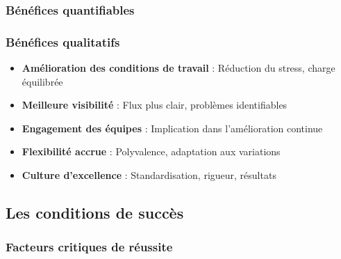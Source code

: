 \documentclass[12pt,a4paper]{article}
\begin{document}
\begin{center}
\subsubsection{Bénéfices quantifiables}

\begin{center}
\end{center}

\subsubsection{Bénéfices qualitatifs}

\begin{itemize}
    \item \textbf{Amélioration des conditions de travail} : Réduction du stress, charge équilibrée
    \item \textbf{Meilleure visibilité} : Flux plus clair, problèmes identifiables
    \item \textbf{Engagement des équipes} : Implication dans l'amélioration continue
    \item \textbf{Flexibilité accrue} : Polyvalence, adaptation aux variations
    \item \textbf{Culture d'excellence} : Standardisation, rigueur, résultats
\end{itemize}

\subsection{Les conditions de succès}

\subsubsection{Facteurs critiques de réussite}


\end{center}
\end{document}
